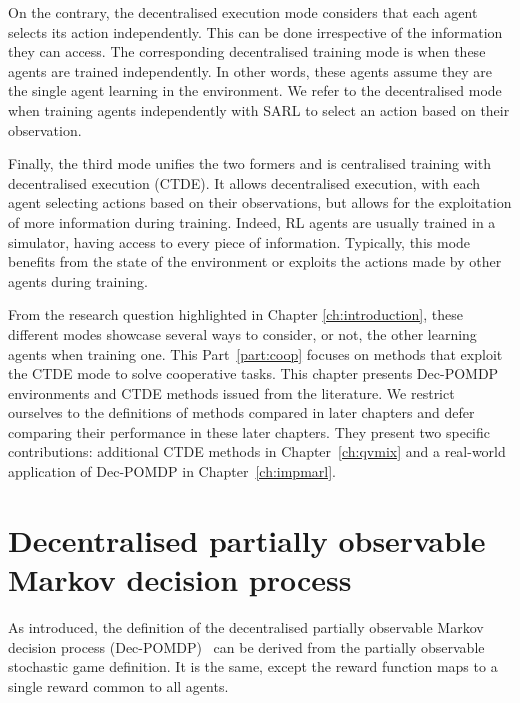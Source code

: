 On the contrary, the decentralised execution mode considers that each agent selects its action independently.
This can be done irrespective of the information they can access.
The corresponding decentralised training mode is when these agents are trained independently.
In other words, these agents assume they are the single agent learning in the environment.
We refer to the decentralised mode when training agents independently with SARL to select an action based on their observation.

Finally, the third mode unifies the two formers and is centralised training with decentralised execution (CTDE).
It allows decentralised execution, with each agent selecting actions based on their observations, but allows for the exploitation of more information during training.
Indeed, RL agents are usually trained in a simulator, having access to every piece of information.
Typically, this mode benefits from the state of the environment or exploits the actions made by other agents during training.

From the research question highlighted in Chapter \ref{ch:introduction}, these different modes showcase several ways to consider, or not, the other learning agents when training one.
This Part~\ref{part:coop} focuses on methods that exploit the CTDE mode to solve cooperative tasks.
This chapter presents Dec-POMDP environments and CTDE methods issued from the literature.
We restrict ourselves to the definitions of methods compared in later chapters and defer comparing their performance in these later chapters.
They present two specific contributions: additional CTDE methods in Chapter~\ref{ch:qvmix} and a real-world application of Dec-POMDP in Chapter~\ref{ch:impmarl}.

\section{Decentralised partially observable Markov decision process}
\label{sec:ch3_decpomdp}
As introduced, the definition of the decentralised partially observable Markov decision process (Dec-POMDP)~\citep{DecPomdp} can be derived from the partially observable stochastic game definition.
It is the same, except the reward function maps to a single reward common to all agents.


